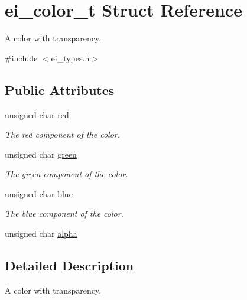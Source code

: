\hypertarget{structei__color__t}{}\section{ei\+\_\+color\+\_\+t Struct Reference}
\label{structei__color__t}


A color with transparency.  




{\ttfamily \#include $<$ei\+\_\+types.\+h$>$}

\subsection*{Public Attributes}
\begin{DoxyCompactItemize}
\item 
\mbox{\label{structei__color__t_a9adf283c79176b3426ac63784f0bc17b}} 
unsigned char \hyperlink{structei__color__t_a9adf283c79176b3426ac63784f0bc17b}{red}
\begin{DoxyCompactList}\small\item\em The red component of the color. \end{DoxyCompactList}\item 
\mbox{\label{structei__color__t_ad85ce262fb9c76fe3c52b4eed19505d1}} 
unsigned char \hyperlink{structei__color__t_ad85ce262fb9c76fe3c52b4eed19505d1}{green}
\begin{DoxyCompactList}\small\item\em The green component of the color. \end{DoxyCompactList}\item 
\mbox{\label{structei__color__t_af8d67b7a72cbb586519b55033350fb8c}} 
unsigned char \hyperlink{structei__color__t_af8d67b7a72cbb586519b55033350fb8c}{blue}
\begin{DoxyCompactList}\small\item\em The blue component of the color. \end{DoxyCompactList}\item 
unsigned char \hyperlink{structei__color__t_af213a14356db920b1a04f5270263ae61}{alpha}
\end{DoxyCompactItemize}


\subsection{Detailed Description}
A color with transparency. 

